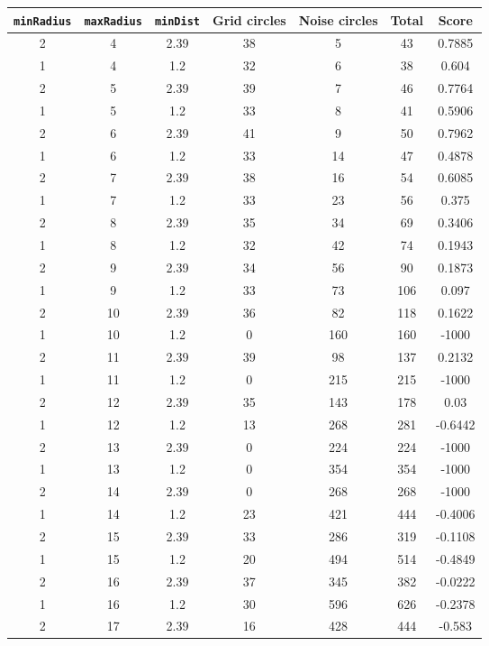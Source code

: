 \documentclass[letterpaper, 12pt]{article}
\begin{document}
\begin{longtable}{|c|c|c|c|c|c|c|}
\hline
\textbf{\texttt{minRadius}} & \textbf{\texttt{maxRadius}} & \textbf{\texttt{minDist}} & \textbf{Grid circles} & \textbf{Noise circles} & \textbf{Total} & \textbf{Score} \\
\hline
2 & 4 & 2.39 & 38 & 5 & 43 & 0.7885 \\
\hline
1 & 4 & 1.2 & 32 & 6 & 38 & 0.604 \\
\hline
2 & 5 & 2.39 & 39 & 7 & 46 & 0.7764 \\
\hline
1 & 5 & 1.2 & 33 & 8 & 41 & 0.5906 \\
\hline
2 & 6 & 2.39 & 41 & 9 & 50 & 0.7962 \\
\hline
1 & 6 & 1.2 & 33 & 14 & 47 & 0.4878 \\
\hline
2 & 7 & 2.39 & 38 & 16 & 54 & 0.6085 \\
\hline
1 & 7 & 1.2 & 33 & 23 & 56 & 0.375 \\
\hline
2 & 8 & 2.39 & 35 & 34 & 69 & 0.3406 \\
\hline
1 & 8 & 1.2 & 32 & 42 & 74 & 0.1943 \\
\hline
2 & 9 & 2.39 & 34 & 56 & 90 & 0.1873 \\
\hline
1 & 9 & 1.2 & 33 & 73 & 106 & 0.097 \\
\hline
2 & 10 & 2.39 & 36 & 82 & 118 & 0.1622 \\
\hline
1 & 10 & 1.2 & 0 & 160 & 160 & -1000 \\
\hline
2 & 11 & 2.39 & 39 & 98 & 137 & 0.2132 \\
\hline
1 & 11 & 1.2 & 0 & 215 & 215 & -1000 \\
\hline
2 & 12 & 2.39 & 35 & 143 & 178 & 0.03 \\
\hline
1 & 12 & 1.2 & 13 & 268 & 281 & -0.6442 \\
\hline
2 & 13 & 2.39 & 0 & 224 & 224 & -1000 \\
\hline
1 & 13 & 1.2 & 0 & 354 & 354 & -1000 \\
\hline
2 & 14 & 2.39 & 0 & 268 & 268 & -1000 \\
\hline
1 & 14 & 1.2 & 23 & 421 & 444 & -0.4006 \\
\hline
2 & 15 & 2.39 & 33 & 286 & 319 & -0.1108 \\
\hline
1 & 15 & 1.2 & 20 & 494 & 514 & -0.4849 \\
\hline
2 & 16 & 2.39 & 37 & 345 & 382 & -0.0222 \\
\hline
1 & 16 & 1.2 & 30 & 596 & 626 & -0.2378 \\
\hline
2 & 17 & 2.39 & 16 & 428 & 444 & -0.583 \\

\end{longtable}
\end{document}
